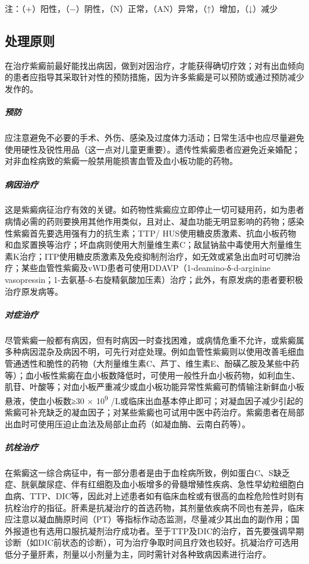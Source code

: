 注：（+）阳性，（−）阴性，（N）正常，（AN）异常，（↑）增加，（↓）减少

\subsection{处理原则}

在治疗紫癜前最好能找出病因，做到对因治疗，才能获得确切疗效；对有出血倾向的患者应指导其采取针对性的预防措施，因为许多紫癜是可以预防或通过预防减少发作的。

\subparagraph{预防}

应注意避免不必要的手术、外伤、感染及过度体力活动；日常生活中也应尽量避免使用硬性及锐性用品（这一点对儿童更重要）。遗传性紫癜患者应避免近亲婚配；对非血栓病致的紫癜一般禁用能损害血管及血小板功能的药物。

\subparagraph{病因治疗}

这是紫癜病征治疗有效的关键。如药物性紫癜应立即停止一切可疑用药，如为患者病情必需的药则要换用其他作用类似，且对止、凝血功能无明显影响的药物；感染性紫癜首先要选用强有力的抗生素；TTP/
HUS使用糖皮质激素、抗血小板药物和血浆置换等治疗；坏血病则使用大剂量维生素C；敌鼠钠盐中毒使用大剂量维生素K治疗；ITP使用糖皮质激素及免疫抑制剂治疗，如无效或紧急出血时可切脾治疗；某些血管性紫癜及vWD患者可使用DDAVP（1-deamino-δ-d-arginine
vasopressin；1-去氨基-δ-右旋精氨酸加压素）治疗；此外，有原发病的患者要积极治疗原发病等。

\subparagraph{对症治疗}

尽管紫癜一般都有病因，但有时病因一时查找困难，或病情危重不允许，或紫癜属多种病因混杂及病因不明，可先行对症处理。例如血管性紫癜则以使用改善毛细血管通透性和脆性的药物（大剂量维生素C、芦丁、维生素E、酚磺乙胺及某些中药等）；血小板性紫癜在血小板数降低时，可使用一般性升血小板药物，如利血生、肌苷、叶酸等；对血小板严重减少或血小板功能异常性紫癜可酌情输注新鲜血小板悬液，使血小板数≥30
× 10\textsuperscript{9}
/L或临床出血基本停止即可；对凝血因子减少引起的紫癜可补充缺乏的凝血因子；对某些紫癜也可试用中医中药治疗。紫癜患者在局部出血时可使用压迫止血法及局部止血药（如凝血酶、云南白药等）。

\subparagraph{抗栓治疗}

在紫癜这一综合病征中，有一部分患者是由于血栓病所致，例如蛋白C、S缺乏症、胱氨酸尿症、伴有红细胞及血小板增多的骨髓增殖性疾病、急性早幼粒细胞白血病、TTP、DIC等，因此对上述患者如有临床血栓或有很高的血栓危险性时则有抗栓治疗的指征。肝素是抗凝治疗的首选药物，其剂量依疾病不同也有差异，临床应注意以凝血酶原时间（PT）等指标作动态监测，尽量减少其出血的副作用；国外报道也有选用口服抗凝剂治疗成功者。至于TTP及DIC的治疗，首先要强调早期诊断（如DIC前状态的诊断），可为治疗争取时间且疗效也较好。抗凝治疗可选用低分子量肝素，剂量以小剂量为主，同时需针对各种致病因素进行治疗。

